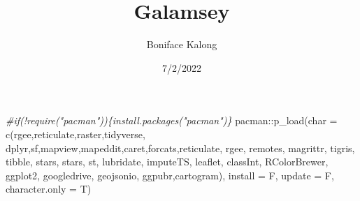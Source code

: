 \documentclass[10pt]{report}
\title{Galamsey}
\author{Boniface Kalong}
\date{7/2/2022}
\newenvironment{Shaded}{\begin{snugshade}}{\end{snugshade}}
\newcommand{\AttributeTok}[1]{\textcolor[rgb]{0.77,0.63,0.00}{#1}}
\newcommand{\CommentTok}[1]{\textcolor[rgb]{0.56,0.35,0.01}{\textit{#1}}}
\newcommand{\FunctionTok}[1]{\textcolor[rgb]{0.00,0.00,0.00}{#1}}
\newcommand{\NormalTok}[1]{#1}
\newcommand{\SpecialCharTok}[1]{\textcolor[rgb]{0.00,0.00,0.00}{#1}}
\newcommand{\StringTok}[1]{\textcolor[rgb]{0.31,0.60,0.02}{#1}}
\begin{document}
\maketitle

\begin{Shaded}
\begin{Highlighting}[]
\CommentTok{\#if(!require("pacman"))\{install.packages("pacman")\}}
\NormalTok{pacman}\SpecialCharTok{::}\FunctionTok{p\_load}\NormalTok{(}\AttributeTok{char =} \FunctionTok{c}\NormalTok{(}\StringTok{\textquotesingle{}rgee\textquotesingle{}}\NormalTok{,}\StringTok{\textquotesingle{}reticulate\textquotesingle{}}\NormalTok{,}\StringTok{\textquotesingle{}raster\textquotesingle{}}\NormalTok{,}\StringTok{\textquotesingle{}tidyverse\textquotesingle{}}\NormalTok{,}
                        \StringTok{\textquotesingle{}dplyr\textquotesingle{}}\NormalTok{,}\StringTok{\textquotesingle{}sf\textquotesingle{}}\NormalTok{,}\StringTok{\textquotesingle{}mapview\textquotesingle{}}\NormalTok{,}\StringTok{\textquotesingle{}mapeddit\textquotesingle{}}\NormalTok{,}\StringTok{\textquotesingle{}caret\textquotesingle{}}\NormalTok{,}\StringTok{\textquotesingle{}forcats\textquotesingle{}}\NormalTok{,}\StringTok{\textquotesingle{}reticulate\textquotesingle{}}\NormalTok{,}
                        \StringTok{\textquotesingle{}rgee\textquotesingle{}}\NormalTok{, }\StringTok{\textquotesingle{}remotes\textquotesingle{}}\NormalTok{, }\StringTok{\textquotesingle{}magrittr\textquotesingle{}}\NormalTok{, }\StringTok{\textquotesingle{}tigris\textquotesingle{}}\NormalTok{, }\StringTok{\textquotesingle{}tibble\textquotesingle{}}\NormalTok{, }\StringTok{\textquotesingle{}stars\textquotesingle{}}\NormalTok{, }\StringTok{\textquotesingle{}stars\textquotesingle{}}\NormalTok{,}
                        \StringTok{\textquotesingle{}st\textquotesingle{}}\NormalTok{, }\StringTok{\textquotesingle{}lubridate\textquotesingle{}}\NormalTok{, }\StringTok{\textquotesingle{}imputeTS\textquotesingle{}}\NormalTok{, }\StringTok{\textquotesingle{}leaflet\textquotesingle{}}\NormalTok{, }\StringTok{\textquotesingle{}classInt\textquotesingle{}}\NormalTok{, }\StringTok{\textquotesingle{}RColorBrewer\textquotesingle{}}\NormalTok{,}
                        \StringTok{\textquotesingle{}ggplot2\textquotesingle{}}\NormalTok{, }\StringTok{\textquotesingle{}googledrive\textquotesingle{}}\NormalTok{, }\StringTok{\textquotesingle{}geojsonio\textquotesingle{}}\NormalTok{, }\StringTok{\textquotesingle{}ggpubr\textquotesingle{}}\NormalTok{,}\StringTok{\textquotesingle{}cartogram\textquotesingle{}}\NormalTok{), }
               \AttributeTok{install =}\NormalTok{ F, }\AttributeTok{update =}\NormalTok{ F, }\AttributeTok{character.only =}\NormalTok{ T)}
\end{Highlighting}
\end{Shaded}
\end{document}
